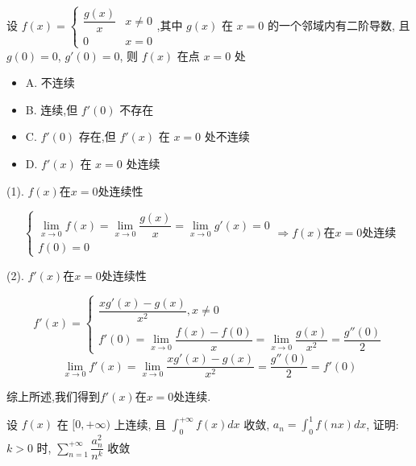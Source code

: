 \begin{example}[][Exam: 35.1.5]
	设 $f(x)=
	\begin{cases}
		\dfrac{g(x)}{x} & x\neq 0\\
		0 & x=0
	\end{cases}$,其中 $g(x)$ 在 $x=0$ 的一个邻域内有二阶导数, 且 $g(0)=0$, $g'(0)=0$, 则 $f(x)$ 在点 $x=0$ 处
	\begin{itemize}
		\item A. 不连续
		\item B. 连续,但 $f'(0)$ 不存在
		\item C. $f'(0)$ 存在,但 $f'(x)$ 在 $x=0$ 处不连续
		\item D. $f'(x)$ 在 $x=0$ 处连续
	\end{itemize}
\end{example}
\begin{solution}

	(1). $f(x)$在$x=0$处连续性
	
	$$\left\lbrace
	\begin{array}{l}
		\lim\limits_{x\to 0}f(x)=\lim\limits_{x\to 0}\dfrac{g(x)}{x}=\lim\limits_{x\to 0}g'(x)=0\\
		f(0)=0
	\end{array}
	\right. \Rightarrow f(x)\text{在}x=0\text{处连续}$$
	
	(2). $f'(x)$在$x=0$处连续性
	
	$$f'(x)=\left\lbrace
	\begin{array}{l}
		\dfrac{xg'(x)-g(x)}{x^2},x\neq 0\\
		f'(0)=\lim\limits_{x\to 0}\dfrac{f(x)-f(0)}{x}=\lim\limits_{x\to 0}\dfrac{g(x)}{x^2}=\dfrac{g''(0)}{2}
	\end{array}
	\right.$$
	$$\lim\limits_{x\to 0}f'(x)=\lim\limits_{x\to 0}\dfrac{xg'(x)-g(x)}{x^2}=\dfrac{g''(0)}{2}=f'(0)$$
	
	综上所述,我们得到$f'(x)$在$x=0$处连续.
\end{solution}

\begin{example}[][Exam: 35.1.6]
	设 $f(x)$ 在 $[0,+\infty)$ 上连续, 且 $\int_{0}^{+\infty}f(x)dx$ 收敛, $a_{n}=\int_{0}^{1}f(nx)dx$, 证明:  
	$k>0$ 时, $\sum\limits_{n=1}^{+\infty}\dfrac{a_{n}^2}{n^k}$ 收敛

\end{example}

